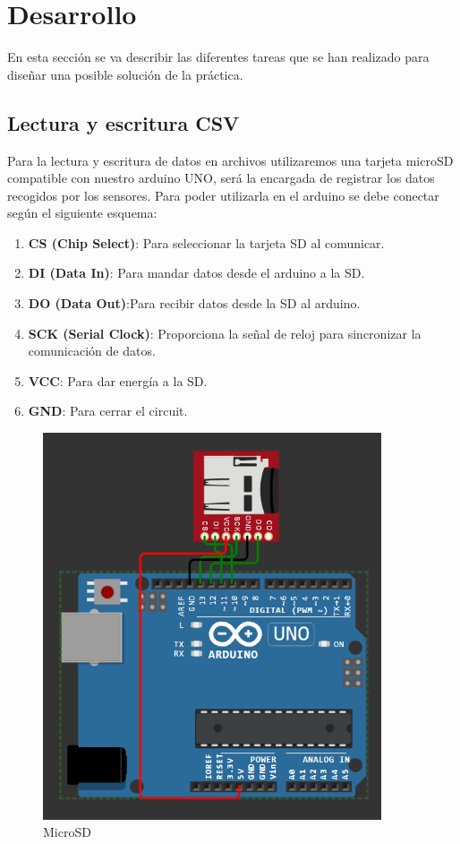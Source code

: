 \section {Desarrollo}

En esta sección se va describir las diferentes tareas que se han realizado para diseñar una posible solución de la práctica.

\subsection{Lectura y escritura CSV}
Para la lectura y escritura de datos en archivos utilizaremos una tarjeta microSD compatible con nuestro arduino UNO, será la encargada de registrar los datos recogidos por los sensores. Para poder utilizarla en el arduino se debe conectar según el siguiente esquema:
\begin{enumerate} 
    \item \textbf{CS (Chip Select)}: Para seleccionar la tarjeta SD al comunicar.
    \item \textbf{DI (Data In)}: Para mandar datos desde el arduino a la SD. 
    \item \textbf{DO (Data Out)}:Para recibir datos desde la SD al arduino. 
    \item \textbf{SCK (Serial Clock)}: Proporciona la señal de reloj para sincronizar la comunicación de datos. 
    \item \textbf{VCC}: Para dar energía a la SD. 
    \item \textbf{GND}: Para cerrar el circuit.
\end{enumerate}

\begin{figure}[H]
    \centering
    \includegraphics[width = 10cm]{ImagenesLatex/microsd.PNG}{}
    \caption{MicroSD}
\end{figure}

